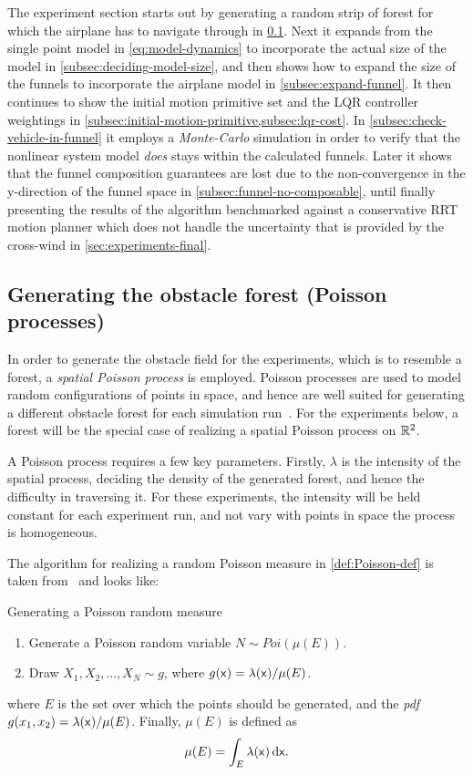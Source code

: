 The experiment section starts out by generating a random strip of forest for
which the airplane has to navigate through in \cref{sec:Poisson-Process}. Next
it expands from the single point model in \cref{eq:model-dynamics} to
incorporate the actual size of the model in \cref{subsec:deciding-model-size},
and then shows how to expand the size of the funnels to incorporate the airplane
model in \cref{subsec:expand-funnel}. It then continues to show the initial
motion primitive set and the \ac{LQR} controller weightings in
\cref{subsec:initial-motion-primitive,subsec:lqr-cost}. In
\cref{subsec:check-vehicle-in-funnel} it employs a \textit{Monte-Carlo}
simulation in order to verify that the nonlinear system model \textit{does}
stays within the calculated funnels. Later it shows that the funnel composition
guarantees are lost due to the non-convergence in the y-direction of the funnel
space in \cref{subsec:funnel-no-composable}, until finally presenting the
results of the \rrtfunnel{} algorithm benchmarked against a conservative
\ac{RRT} motion planner which does not handle the uncertainty that is provided
by the cross-wind in \cref{sec:experiments-final}.

\subsection{Generating the obstacle forest (Poisson processes)}
\label{sec:Poisson-Process}

In order to generate the obstacle field for the experiments, which is to
resemble a forest, a \textit{spatial Poisson process} is employed. Poisson
processes are used to model random configurations of points in space, and hence
are well suited for generating a different obstacle forest for each simulation
run~\cite{Kroese_2014}. For the experiments below, a forest will be the special
case of realizing a spatial Poisson process on \(\mathbb{R}^2\).

A Poisson process requires a few key parameters. Firstly, \(\lambda\) is the
intensity of the spatial process, deciding the density of the generated forest,
and hence the difficulty in traversing it. For these experiments, the intensity
will be held constant for each experiment run, and not vary with points in space
\ie the process is homogeneous.

The algorithm for realizing a random Poisson measure in \cref{def:Poisson-def}
is taken from~\cite[Definition~1.1.1][34]{Kroese_2014} and looks like:

\begin{definition}{Generating a Poisson random measure}
  \label{def:Poisson-def}
  \begin{enumerate}
  \item Generate a Poisson random variable \(N \sim Poi(\mu(E))\).
  \item Draw \(X_1,X_2,\ldots,X_N \sim g\), where \(g({\mathbf{\mathsf{x}}}) = \lambda({\mathbf{\mathsf{x}}})/ \mu(E)\).
  \end{enumerate}
\end{definition}
where \(E\) is the set over which the points should be generated, and the
\textit{pdf} \(g(x_1, x_2) = \lambda({\mathbf{\mathsf{x}}})/\mu(E)\). Finally, \(\mu(E)\) is
defined as
\[
  \mu(E) = \int_{E} \lambda({\mathbf{\mathsf{x}}})\, \mathrm{d} {\mathbf{\mathsf{x}}}.
\]

